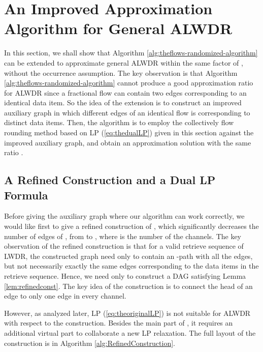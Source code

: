 \documentclass[11pt,english,onecolumn,draftcls]{IEEEtran}
\theoremstyle{plain}
\theoremstyle{plain}
\theoremstyle{plain}
\theoremstyle{plain}
\begin{document}
\section{An Improved Approximation Algorithm for General ALWDR}

In this section, we shall show that Algorithm \ref{alg:theflows-randomized-algorithm}
can be extended to approximate general ALWDR within
the same factor of , without the occurrence assumption.
The key observation is that Algorithm \ref{alg:theflows-randomized-algorithm}
cannot produce a good approximation ratio for ALWDR
since a fractional flow can contain two edges corresponding to an
identical data item. So the idea of the extension is to construct
an improved auxiliary graph in which different edges of an identical flow
is corresponding to distinct data items. Then, the algorithm is to
employ the collectively flow rounding method based on LP (\ref{eq:thedualLP})
given in this section against the improved auxiliary graph, and obtain
an approximation solution with the same ratio .


\subsection{A Refined Construction and a Dual LP Formula}

Before giving the auxiliary graph where our algorithm can work correctly,
we would like first to give a refined construction of , which
significantly decreases the number of edges of , from 
to , where  is the number of the channels.
The key observation of the refined construction is that for a valid
retrieve sequence of LWDR, the constructed graph need only to contain
an -path with all the edges, but not necessarily exactly the
same edges corresponding to the data items in the retrieve sequence.
Hence, we need only to construct a DAG satisfying Lemma \ref{lem:refinedconst}.
The key idea of the construction is to connect the head of an edge
to only one edge in every channel.

However, as analyzed later, LP (\ref{eq:theoriginalLP}) is not suitable
for ALWDR with respect to the construction. Besides
the main part of , it requires an additional virtual part to collaborate
a new LP relaxation. The full layout of the construction is in Algorithm
\ref{alg:RefinedConstruction}.
\end{document}
